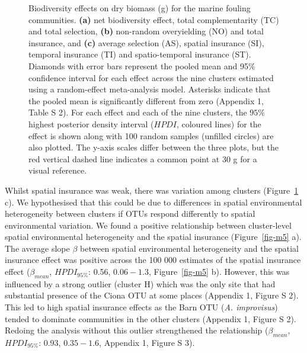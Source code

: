 \documentclass[
  letterpaper,
  DIV=11,
  numbers=noendperiod]{scrartcl}
\begin{document}
\begin{figure}


\caption{\label{fig-m4}Biodiversity effects on dry biomass (g) for the
marine fouling communities. \textbf{(a)} net biodiversity effect, total
complementarity (TC) and total selection, \textbf{(b)} non-random
overyielding (NO) and total insurance, and \textbf{(c)} average
selection (AS), spatial insurance (SI), temporal insurance (TI) and
spatio-temporal insurance (ST). Diamonds with error bars represent the
pooled mean and 95\% confidence interval for each effect across the nine
clusters estimated using a random-effect meta-analysis model. Asterisks
indicate that the pooled mean is significantly different from zero
(Appendix 1, Table S 2). For each effect and each of the nine clusters,
the \(95\%\) highest posterior density interval (\(HPDI\), coloured
lines) for the effect is shown along with 100 random samples (unfilled
circles) are also plotted. The y-axis scales differ between the three
plots, but the red vertical dashed line indicates a common point at 30 g
for a visual reference.}

\end{figure}%

Whilst spatial insurance was weak, there was variation among clusters
(Figure~\ref{fig-m4} c). We hypothesised that this could be due to
differences in spatial environmental heterogeneity between clusters if
OTUs respond differently to spatial environmental variation. We found a
positive relationship between cluster-level spatial environmental
heterogeneity and the spatial insurance (Figure~\ref{fig-m5} a). The
average slope \(\beta\) between spatial environmental heterogeneity and
the spatial insurance effect was positive across the 100 000 estimates
of the spatial insurance effect (\(\beta_{mean}\), \(HPDI_{95\%}\):
0.56, \(0.06 - 1.3\), Figure~\ref{fig-m5} b). However, this was
influenced by a strong outlier (cluster H) which was the only site that
had substantial presence of the Ciona OTU at some places (Appendix 1,
Figure S 2). This led to high spatial insurance effects as the Barn OTU
(\emph{A. improvisus}) tended to dominate communities in the other
clusters (Appendix 1, Figure S 2). Redoing the analysis without this
outlier strengthened the relationship (\(\beta_{mean}\),
\(HPDI_{95\%}\): 0.93, \(0.35 - 1.6\), Appendix 1, Figure S 3).
\end{document}
